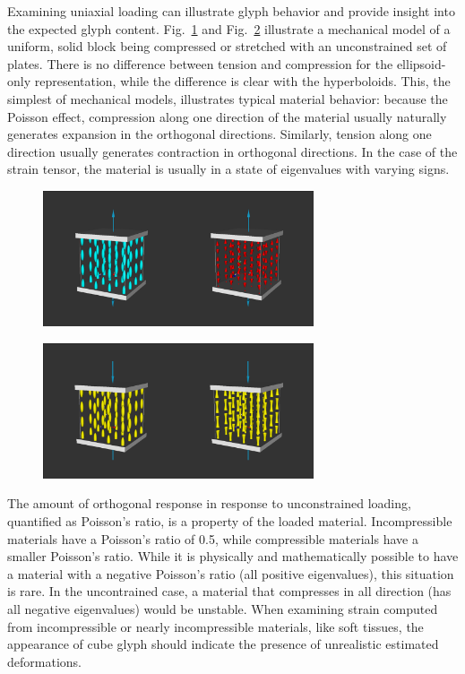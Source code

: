 \documentclass{InsightArticle}
\begin{document}
Examining uniaxial loading can illustrate glyph behavior and provide insight
into the expected glyph content. Fig.~\ref{fig:uniaxialtension} and
Fig.~\ref{fig:uniaxialcompression} illustrate a mechanical model of a uniform,
solid block being compressed or stretched with an unconstrained set of plates.
There is no difference between tension and compression for the ellipsoid-only
representation, while the difference is clear with the hyperboloids.  This,
the simplest of mechanical models, illustrates typical material behavior:
because the Poisson effect, compression along one direction of the material
usually naturally generates expansion in the orthogonal directions.
Similarly, tension along one direction usually generates contraction in
orthogonal directions. In the case of the strain tensor, the material is
usually in a state of eigenvalues with varying signs.

\begin{figure}
\center
\includegraphics[width=8cm]{UniaxialTension}
\label{fig:uniaxialtension}
\end{figure}

\begin{figure}
\center
\includegraphics[width=8cm]{UniaxialCompression}
\label{fig:uniaxialcompression}
\end{figure}

The amount of orthogonal response in response to unconstrained loading,
quantified as Poisson's ratio, is a property of the loaded material.
Incompressible materials have a Poisson's ratio of 0.5, while compressible
materials have a smaller Poisson's ratio. While it is physically and
mathematically possible to have a material with a negative Poisson's ratio
\cite{Lakes1987,Lakes1988} (all positive eigenvalues), this situation is
rare. In the uncontrained case, a material that compresses in all direction
(has all negative eigenvalues) would be unstable. When examining strain
computed from incompressible or nearly incompressible materials, like soft
tissues, the appearance of cube glyph should indicate the presence of
unrealistic estimated deformations.
\end{document}
